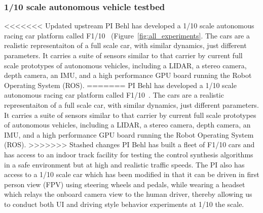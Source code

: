 \subsubsection{1/10 scale autonomous vehicle testbed}

<<<<<<< Updated upstream
PI Behl has developed a 1/10 scale autonomous racing car platform called F1/10~ (Figure~\ref{fig:all_experiments}. The cars are a realistic representaiton of a full scale car, with similar dynamics, just different parameters. It carries a suite of sensors similar to that carrier by current full scale prototypes of autonomous vehicles, including a LIDAR, a stereo camera, depth camera, an IMU, and a high performance GPU board running the Robot Operating System (ROS).
=======
PI Behl has developed a 1/10 scale autonomous racing car platform called F1/10~\cite{f1tenth}. The cars are a realistic representaiton of a full scale car, with similar dynamics, just different parameters. It carries a suite of sensors similar to that carrier by current full scale prototypes of autonomous vehicles, including a LIDAR, a stereo camera, depth camera, an IMU, and a high performance GPU board running the Robot Operating System (ROS).
>>>>>>> Stashed changes
PI Behl has built a fleet of F1/10 cars and has access to an indoor track facility for testing the control synthesis algorithms in a safe environment but at high and realistic traffic speeds. The PI also has access to a 1/10 scale car which has been modified in that it can be driven in first person view (FPV) using steering wheels and pedals, while wearing a headset which relays the onboard camera view to the human driver, thereby allowing us to conduct both UI and driving style behavior experiments at 1/10 the scale.



